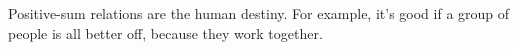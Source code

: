 Positive-sum relations are the human destiny.
For example, it's good if a group of people is all better off, because they work together.